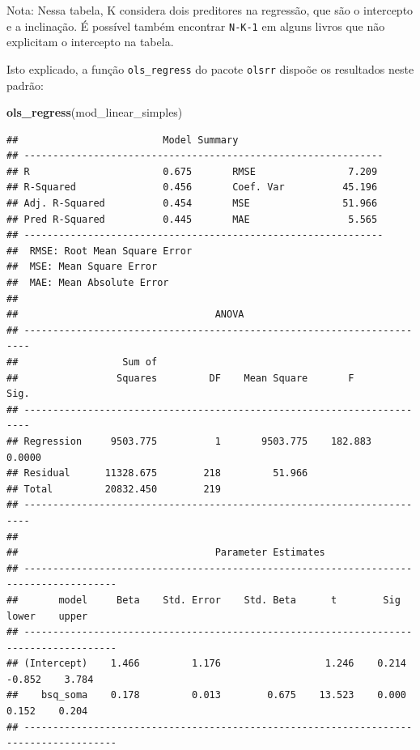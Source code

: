 \documentclass[
]{book}
\newenvironment{Shaded}{\begin{snugshade}}{\end{snugshade}}
\newcommand{\KeywordTok}[1]{\textcolor[rgb]{0.13,0.29,0.53}{\textbf{#1}}}
\newcommand{\NormalTok}[1]{#1}
\begin{document}
Nota: Nessa tabela, K considera dois preditores na regressão, que são o
intercepto e a inclinação. É possível também encontrar \texttt{N-K-1} em
alguns livros que não explicitam o intercepto na tabela.

Isto explicado, a função \texttt{ols\_regress} do pacote \texttt{olsrr}
dispoõe os resultados neste padrão:

\begin{Shaded}
\begin{Highlighting}[]
\KeywordTok{ols_regress}\NormalTok{(mod_linear_simples) }
\end{Highlighting}
\end{Shaded}

\begin{verbatim}
##                         Model Summary                          
## --------------------------------------------------------------
## R                       0.675       RMSE                7.209 
## R-Squared               0.456       Coef. Var          45.196 
## Adj. R-Squared          0.454       MSE                51.966 
## Pred R-Squared          0.445       MAE                 5.565 
## --------------------------------------------------------------
##  RMSE: Root Mean Square Error 
##  MSE: Mean Square Error 
##  MAE: Mean Absolute Error 
## 
##                                  ANOVA                                  
## -----------------------------------------------------------------------
##                  Sum of                                                
##                 Squares         DF    Mean Square       F         Sig. 
## -----------------------------------------------------------------------
## Regression     9503.775          1       9503.775    182.883    0.0000 
## Residual      11328.675        218         51.966                      
## Total         20832.450        219                                     
## -----------------------------------------------------------------------
## 
##                                  Parameter Estimates                                   
## --------------------------------------------------------------------------------------
##       model     Beta    Std. Error    Std. Beta      t        Sig      lower    upper 
## --------------------------------------------------------------------------------------
## (Intercept)    1.466         1.176                  1.246    0.214    -0.852    3.784 
##    bsq_soma    0.178         0.013        0.675    13.523    0.000     0.152    0.204 
## --------------------------------------------------------------------------------------
\end{verbatim}
\end{document}
